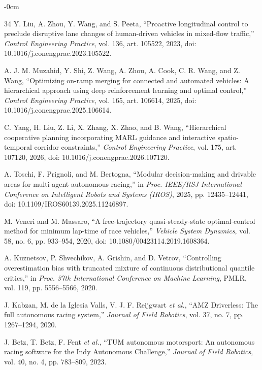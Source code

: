 \documentclass[sensors,article,submit,moreauthors]{Definitions/mdpi}
\begin{document}
\begin{adjustwidth}{-\extralength}{0cm}
\begin{thebibliography}{34}
Y. Liu, A. Zhou, Y. Wang, and S. Peeta,
``Proactive longitudinal control to preclude disruptive lane changes of
human-driven vehicles in mixed-flow traffic,''
\emph{Control Engineering Practice}, vol. 136, art. 105522, 2023,
doi: 10.1016/j.conengprac.2023.105522.

A. J. M. Muzahid, Y. Shi, Z. Wang, A. Zhou, A. Cook, C. R. Wang, and Z. Wang,
``Optimizing on-ramp merging for connected and automated vehicles: A
hierarchical approach using deep reinforcement learning and optimal control,''
\emph{Control Engineering Practice}, vol. 165, art. 106614, 2025,
doi: 10.1016/j.conengprac.2025.106614.

C. Yang, H. Liu, Z. Li, X. Zhang, X. Zhao, and B. Wang,
``Hierarchical cooperative planning incorporating MARL guidance and
interactive spatio-temporal corridor constraints,''
\emph{Control Engineering Practice}, vol. 175, art. 107120, 2026,
doi: 10.1016/j.conengprac.2026.107120.

A. Toschi, F. Prignoli, and M. Bertogna,
``Modular decision-making and drivable areas for multi-agent autonomous
racing,'' in \emph{Proc. IEEE/RSJ International Conference on Intelligent
Robots and Systems (IROS)}, 2025, pp. 12435--12441,
doi: 10.1109/IROS60139.2025.11246897.

M. Veneri and M. Massaro,
``A free-trajectory quasi-steady-state optimal-control method for minimum
lap-time of race vehicles,''
\emph{Vehicle System Dynamics}, vol. 58, no. 6, pp. 933--954, 2020,
doi: 10.1080/00423114.2019.1608364.

A. Kuznetsov, P. Shvechikov, A. Grishin, and D. Vetrov,
``Controlling overestimation bias with truncated mixture of continuous
distributional quantile critics,'' in \emph{Proc. 37th International
Conference on Machine Learning}, PMLR, vol. 119, pp. 5556--5566, 2020.

J. Kabzan, M. de la Iglesia Valls, V. J. F. Reijgwart \emph{et al.},
``AMZ Driverless: The full autonomous racing system,''
\emph{Journal of Field Robotics}, vol. 37, no. 7, pp. 1267--1294, 2020.

J. Betz, T. Betz, F. Fent \emph{et al.},
``TUM autonomous motorsport: An autonomous racing software for the Indy
Autonomous Challenge,'' \emph{Journal of Field Robotics}, vol. 40, no. 4,
pp. 783--809, 2023.

\end{thebibliography}
\end{adjustwidth}
\end{document}
